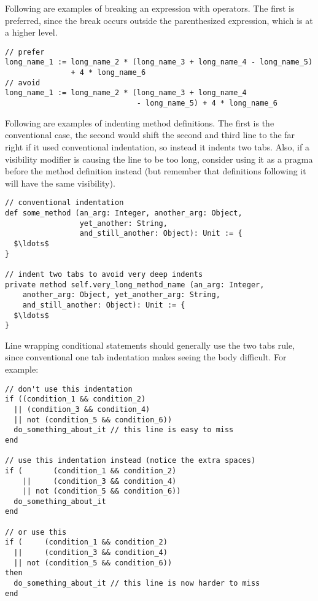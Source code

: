 \example Following are examples of breaking an expression with operators. The first is preferred, since the break occurs outside the parenthesized expression, which is at a higher level. 

\begin{lstlisting}
// prefer
long_name_1 := long_name_2 * (long_name_3 + long_name_4 - long_name_5)
               + 4 * long_name_6
// avoid
long_name_1 := long_name_2 * (long_name_3 + long_name_4 
                              - long_name_5) + 4 * long_name_6
\end{lstlisting}

\example Following are examples of indenting method definitions. The first is the conventional case, the second would shift the second and third line to the far right if it used conventional indentation, so instead it indents two tabs. Also, if a visibility modifier is causing the line to be too long, consider using it as a pragma before the method definition instead (but remember that definitions following it will have the same visibility). 

\begin{lstlisting}
// conventional indentation
def some_method (an_arg: Integer, another_arg: Object, 
                 yet_another: String,
                 and_still_another: Object): Unit := {
  $\ldots$
}

// indent two tabs to avoid very deep indents
private method self.very_long_method_name (an_arg: Integer,
    another_arg: Object, yet_another_arg: String, 
    and_still_another: Object): Unit := {
  $\ldots$
}
\end{lstlisting}

\example Line wrapping conditional statements should generally use the two tabs rule, since conventional one tab indentation makes seeing the body difficult. For example: 

\begin{lstlisting}
// don't use this indentation
if ((condition_1 && condition_2)
  || (condition_3 && condition_4)
  || not (condition_5 && condition_6))
  do_something_about_it // this line is easy to miss
end

// use this indentation instead (notice the extra spaces)
if (       (condition_1 && condition_2)
    ||     (condition_3 && condition_4)
    || not (condition_5 && condition_6))
  do_something_about_it
end

// or use this
if (     (condition_1 && condition_2)
  ||     (condition_3 && condition_4)
  || not (condition_5 && condition_6))
then
  do_something_about_it // this line is now harder to miss
end
\end{lstlisting}

